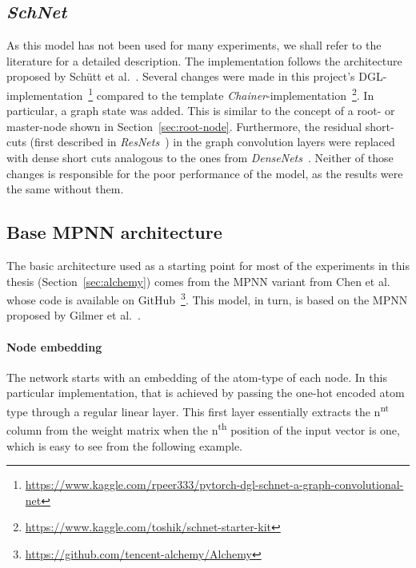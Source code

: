 \subsection{\textit{SchNet}}
\label{sec:schnet-architecture}

As this model has not been used for many experiments, we shall refer to the literature for a detailed description. The implementation follows the architecture proposed by Schütt et al.~\cite{Schutt2017}. Several changes were made in this project's DGL-implementation~\footnote{\url{https://www.kaggle.com/rpeer333/pytorch-dgl-schnet-a-graph-convolutional-net}} compared to the template \textit{Chainer}-implementation~\footnote{\url{https://www.kaggle.com/toshik/schnet-starter-kit}}. In particular, a graph state was added. This is similar to the concept of a root- or master-node shown in Section~\ref{sec:root-node}. Furthermore, the residual short-cuts (first described in \textit{ResNets}~\cite{Sun2016}) in the graph convolution layers were replaced with dense short cuts analogous to the ones from \textit{DenseNets}~\cite{Huang2017}. Neither of those changes is responsible for the poor performance of the model, as the results were the same without them.


\subsection{Base MPNN architecture}
\label{sec:mpnn-architecture}

The basic architecture used as a starting point for most of the experiments in this thesis (Section~\ref{sec:alchemy}) comes from the MPNN variant from Chen et al.~\cite{Chen2019} whose code is available on GitHub~\footnote{\url{https://github.com/tencent-alchemy/Alchemy}}. This model, in turn, is based on the MPNN proposed by Gilmer et al.~\cite{Gilmer2017}.


\paragraph{Node embedding}The network starts with an embedding of the atom-type of each node. In this particular implementation, that is achieved by passing the one-hot encoded atom type through a regular linear layer. This first layer essentially extracts the n\textsuperscript{nt} column from the weight matrix when the n\textsuperscript{th} position of the input vector is one, which is easy to see from the following example.

